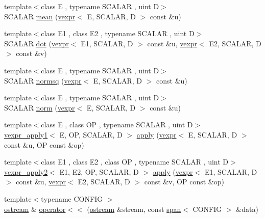 \begin{DoxyCompactItemize}
\item 
{\footnotesize template$<$class E , typename S\+C\+A\+L\+AR , uint D$>$ }\\S\+C\+A\+L\+AR \hyperlink{namespacemui_ab8a08347893aa523b3d358ab3c7e81e6}{mean} (\hyperlink{structmui_1_1vexpr}{vexpr}$<$ E, S\+C\+A\+L\+AR, D $>$ const \&u)
\item 
{\footnotesize template$<$class E1 , class E2 , typename S\+C\+A\+L\+AR , uint D$>$ }\\S\+C\+A\+L\+AR \hyperlink{namespacemui_a0a094bed72df9ad9beec2db0706a85ad}{dot} (\hyperlink{structmui_1_1vexpr}{vexpr}$<$ E1, S\+C\+A\+L\+AR, D $>$ const \&u, \hyperlink{structmui_1_1vexpr}{vexpr}$<$ E2, S\+C\+A\+L\+AR, D $>$ const \&v)
\item 
{\footnotesize template$<$class E , typename S\+C\+A\+L\+AR , uint D$>$ }\\S\+C\+A\+L\+AR \hyperlink{namespacemui_af4c205dbd695bbcc3fc33cf9b46e8691}{normsq} (\hyperlink{structmui_1_1vexpr}{vexpr}$<$ E, S\+C\+A\+L\+AR, D $>$ const \&u)
\item 
{\footnotesize template$<$class E , typename S\+C\+A\+L\+AR , uint D$>$ }\\S\+C\+A\+L\+AR \hyperlink{namespacemui_afc24552d3db09a672443b14f96b2b8aa}{norm} (\hyperlink{structmui_1_1vexpr}{vexpr}$<$ E, S\+C\+A\+L\+AR, D $>$ const \&u)
\item 
{\footnotesize template$<$class E , class OP , typename S\+C\+A\+L\+AR , uint D$>$ }\\\hyperlink{structmui_1_1vexpr__apply1}{vexpr\+\_\+apply1}$<$ E, OP, S\+C\+A\+L\+AR, D $>$ \hyperlink{namespacemui_af94c98a0248d6923c8681b4d2c39df6e}{apply} (\hyperlink{structmui_1_1vexpr}{vexpr}$<$ E, S\+C\+A\+L\+AR, D $>$ const \&u, OP const \&op)
\item 
{\footnotesize template$<$class E1 , class E2 , class OP , typename S\+C\+A\+L\+AR , uint D$>$ }\\\hyperlink{structmui_1_1vexpr__apply2}{vexpr\+\_\+apply2}$<$ E1, E2, OP, S\+C\+A\+L\+AR, D $>$ \hyperlink{namespacemui_a8636e43027b552ba308a2da852512941}{apply} (\hyperlink{structmui_1_1vexpr}{vexpr}$<$ E1, S\+C\+A\+L\+AR, D $>$ const \&u, \hyperlink{structmui_1_1vexpr}{vexpr}$<$ E2, S\+C\+A\+L\+AR, D $>$ const \&v, OP const \&op)
\item 
{\footnotesize template$<$typename C\+O\+N\+F\+IG $>$ }\\\hyperlink{classmui_1_1ostream}{ostream} \& \hyperlink{namespacemui_af0615fca077c7374e53a2421cb7296f3}{operator$<$$<$} (\hyperlink{classmui_1_1ostream}{ostream} \&stream, const \hyperlink{classmui_1_1span}{span}$<$ C\+O\+N\+F\+IG $>$ \&data)

\end{DoxyCompactItemize}
